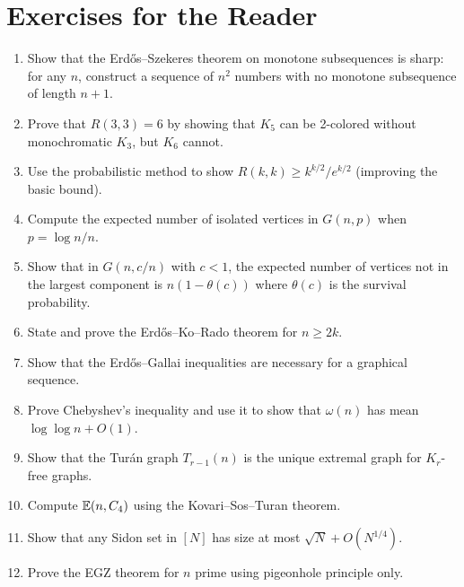 \section*{Exercises for the Reader}
\begin{enumerate}
    \item [I] Show that the Erd\H{o}s--Szekeres theorem on monotone subsequences is sharp: for any $n$, construct a sequence of $n^2$ numbers with no monotone subsequence of length $n+1$.
    \item [B] Prove that $R(3,3) = 6$ by showing that $K_5$ can be 2-colored without monochromatic $K_3$, but $K_6$ cannot.
    \item [I] Use the probabilistic method to show $R(k,k) \geq k^{k/2}/e^{k/2}$ (improving the basic bound).
    \item [B] Compute the expected number of isolated vertices in $G(n,p)$ when $p = \log n/n$.
    \item [I] Show that in $G(n, c/n)$ with $c < 1$, the expected number of vertices not in the largest component is $n(1 - \theta(c))$ where $\theta(c)$ is the survival probability.
    \item [I] State and prove the Erd\H{o}s--Ko--Rado theorem for $n \geq 2k$.
    \item [I] Show that the Erd\H{o}s--Gallai inequalities are necessary for a graphical sequence.
    \item [I] Prove Chebyshev's inequality and use it to show that $\omega(n)$ has mean $\log\log n + O(1)$.
    \item [I] Show that the Tur\'{a}n graph $T_{r-1}(n)$ is the unique extremal graph for $K_r$-free graphs.
    \item [I] Compute $\mathbb{E}(n, C_4)$ using the Kovari--Sos--Turan theorem.
    \item [I] Show that any Sidon set in $[N]$ has size at most $\sqrt{N} + O(N^{1/4})$.
    \item [I] Prove the EGZ theorem for $n$ prime using pigeonhole principle only.
\end{enumerate}


